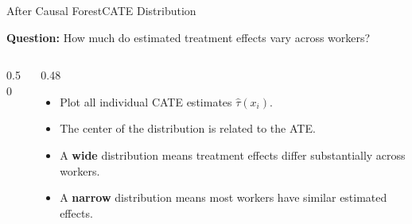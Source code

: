 \documentclass[hyperref={pdfpagelabels=false}]{beamer}
\begin{document}
\begin{frame}{After Causal Forest}{CATE Distribution}

\textbf{Question:} How much do estimated treatment effects vary across workers?

\vspace{0.2cm}

\begin{columns}[T]
\begin{column}{0.50\textwidth}
\begin{center}
\end{center}
\end{column}

\begin{column}{0.48\textwidth}
\begin{itemize}
  \item Plot all individual CATE estimates $\hat{\tau}(x_i)$.
  \vspace{0.15cm}
  \item The center of the distribution is related to the ATE.
  \vspace{0.15cm}
  \item A \textbf{wide} distribution means treatment effects differ substantially across workers.
  \vspace{0.15cm}
  \item A \textbf{narrow} distribution means most workers have similar estimated effects.
\end{itemize}
\end{column}
\end{columns}

\vspace{0.2cm}

\begin{center}
\end{center}

\end{frame}
\end{document}
